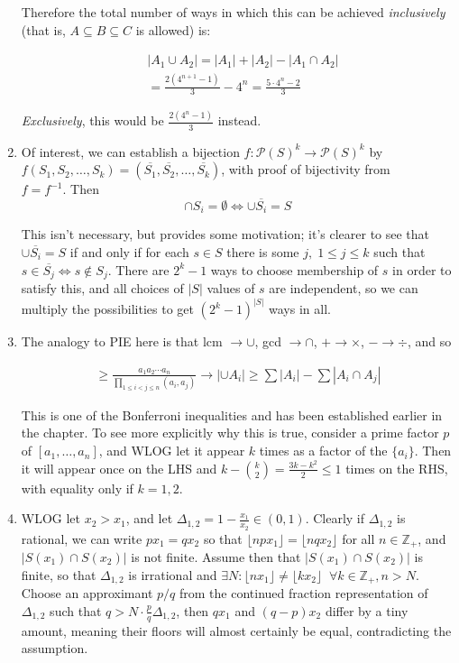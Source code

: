 \documentclass{book}
\numberwithin{equation}{section}
\begin{document}
\begin{enumerate}[label={6.\arabic*}]
Therefore the total number of ways in which this can be achieved \emph{inclusively} (that is, $A \subseteq B \subseteq C$
is allowed) is:

\begin{align*}
& |A_1 \cup A_2| = |A_1| + |A_2| - |A_1 \cap A_2| \\
& = \frac{2(4^{n+1} - 1)}{3} - 4^n = \frac{5\cdot 4^n - 2}{3}
\end{align*}

\emph{Exclusively}, this would be $\frac{2(4^n-1)}{3}$ instead.

\item
Of interest, we can establish a bijection $f : \mathcal{P}(S)^k \to \mathcal{P}(S)^k$ by \\ 
$f(S_1, S_2, \ldots, S_k) = (\overline{S_1}, \overline{S_2}, \ldots, \overline{S_k})$, with proof of bijectivity from \\
$f = f^{-1}$. Then $$\cap S_i = \emptyset \iff \cup \overline{S_i} = S$$

This isn't necessary, but provides some motivation; it's clearer to see that $\cup \overline{S_i} = S$ if and only if for each
$s \in S$ there is some $j, \;1 \leq j \leq k$ such that $s \in \overline{S_j} \iff s \not\in S_j$. There are $2^k - 1$ ways to
choose membership of $s$ in order to satisfy this, and all choices of $|S|$ values of $s$ are independent, so we can
multiply the possibilities to get $(2^k - 1)^{|S|}$ ways in all.

\item
The analogy to PIE here is that lcm $\to \cup$, gcd $\to \cap$, $+ \to \times$, $- \to \div$, and so

\begin{align*}
[a_1, \ldots, a_n] \geq \frac{a_1a_2\cdots a_n}{\prod_{1 \leq i < j \leq n}(a_i, a_j)} \to |\cup A_i| \geq \sum|A_i| - \sum|A_i \cap A_j|
\end{align*}

This is one of the Bonferroni inequalities and has been established earlier in the chapter. To see more explicitly why
this is true, consider a prime factor $p$ of $[a_1, \ldots, a_n]$, and WLOG let it appear $k$ times as a factor of the
$\{ a_i \}$. Then it will appear once on the LHS and $k - {k \choose 2} = \frac{3k - k^2}{2} \leq 1$ times on the RHS,
with equality only if $k=1, 2$.

\item
WLOG let $x_2 > x_1$, and let $\Delta_{1,2} = 1 - \frac{x_1}{x_2} \in (0, 1)$. Clearly if $\Delta_{1,2}$ is rational, we can write
$px_1 = qx_2$ so that $\lfloor npx_1 \rfloor = \lfloor nqx_2 \rfloor$ for all $n \in \mathbb{Z}_+$, and
$|S(x_1) \cap S(x_2)|$ is not finite. Assume then that $|S(x_1) \cap S(x_2)|$ is finite, so that $\Delta_{1,2}$ is
irrational and $\exists N : \lfloor nx_1 \rfloor \neq \lfloor kx_2 \rfloor \;\; \forall k \in \mathbb{Z}_+, n > N$.
Choose an approximant $p/q$ from the continued fraction representation of $\Delta_{1,2}$ such that
$q > N\cdot \frac{p}{q} \Delta_{1,2}$, then $qx_1$ and $(q-p)x_2$ differ by a tiny amount, meaning their floors
will almost certainly be equal, contradicting the assumption. \\


\end{enumerate}
\end{document}
